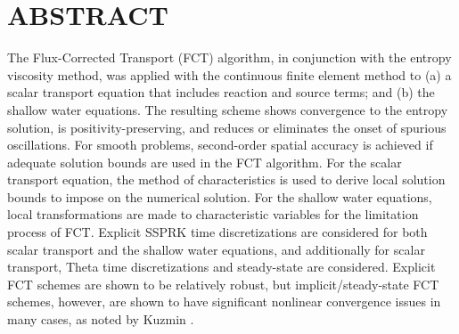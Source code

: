 \chapter*{ABSTRACT}

\pagestyle{plain} %
\setcounter{page}{2}

\indent
The Flux-Corrected Transport (FCT) algorithm, in conjunction with the
entropy viscosity method, was applied with the continuous finite element method
to (a) a scalar transport equation that includes reaction and source terms; and
(b) the shallow water equations.
The resulting scheme shows convergence to the entropy solution, is
positivity-preserving, and reduces or eliminates the onset of spurious oscillations.
For smooth problems, second-order spatial accuracy is achieved if adequate
solution bounds are used in the FCT algorithm. 
For the scalar transport equation, the method of characteristics is used
to derive local solution bounds to impose on the numerical solution.
For the shallow water equations, local transformations are made
to characteristic variables for the limitation process of FCT.
Explicit SSPRK time discretizations are considered for both scalar
transport and the shallow water equations, and additionally
for scalar transport, Theta time discretizations and
steady-state are considered. Explicit FCT schemes are shown to
be relatively robust, but implicit/steady-state FCT schemes, however,
are shown to have significant nonlinear convergence issues in many cases,
as noted by Kuzmin \cite{kuzmin_FCT}.

\pagebreak{}
